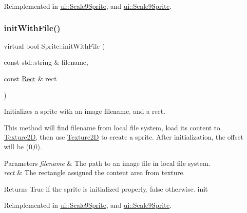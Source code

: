 Reimplemented in \hyperlink{classui_1_1Scale9Sprite_a2c5a440147b13f433454d65a20a31398}{ui\+::\+Scale9\+Sprite}, and \hyperlink{classui_1_1Scale9Sprite_ad3e4f907faf79e406320c10ca0785a39}{ui\+::\+Scale9\+Sprite}.

\mbox{\label{classSprite_afe60b77e359cc2363b14eb80a6fb4068}} 
\subsubsection{\texorpdfstring{init\+With\+File()}{initWithFile()}\hspace{0.1cm}{\footnotesize\ttfamily [4/4]}}
{\footnotesize\ttfamily virtual bool Sprite\+::init\+With\+File (\begin{DoxyParamCaption}\item[{const std\+::string \&}]{filename,  }\item[{const \hyperlink{classRect}{Rect} \&}]{rect }\end{DoxyParamCaption})\hspace{0.3cm}{\ttfamily [virtual]}}

Initializes a sprite with an image filename, and a rect.

This method will find filename from local file system, load its content to \hyperlink{classTexture2D}{Texture2D}, then use \hyperlink{classTexture2D}{Texture2D} to create a sprite. After initialization, the offset will be (0,0).


\begin{DoxyParams}{Parameters}
{\em filename} & The path to an image file in local file system. \\
\hline
{\em rect} & The rectangle assigned the content area from texture. \\
\hline
\end{DoxyParams}
\begin{DoxyReturn}{Returns}
True if the sprite is initialized properly, false otherwise.  init 
\end{DoxyReturn}


Reimplemented in \hyperlink{classui_1_1Scale9Sprite_a8ec4db44e4fdf3b0a4cdfef646dbdd6a}{ui\+::\+Scale9\+Sprite}, and \hyperlink{classui_1_1Scale9Sprite_a33ee4d10ad6015a645f701ddfa2ab4d7}{ui\+::\+Scale9\+Sprite}.

\mbox{\label{classSprite_ad2f432b077c8e919ca9e20c34e8610f8}} 
